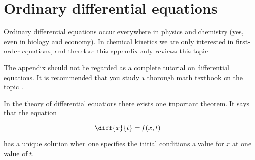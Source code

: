 \chapter{Ordinary differential equations}
\label{chap:ode}

Ordinary differential equations occur everywhere in physics and
chemistry (yes, even in biology and economy). In chemical kinetics we
are only interested in first-order equations, and therefore this
appendix only reviews this topic.

The appendix should not be regarded as a complete tutorial on
differential equations. It is recommended that you study a thorough
math textbook on the topic \eg \cite{kreyszig}.

In the theory of differential equations there exists one important
theorem. It says that the equation

\begin{equation}
  \diff{x}{t} = f(x, t)
\end{equation}

has a unique solution when one specifies the initial conditions \ie
a value for $x$ at one value of $t$.
